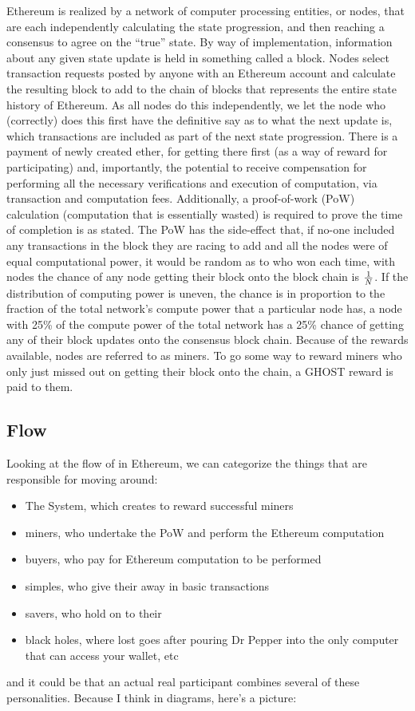 \documentclass[10pt,a4paper]{article}
\begin{document}
Ethereum is realized by a network of computer processing entities, or nodes, that are each independently calculating the state progression, and then reaching a consensus to agree on the ``true'' state. By way of implementation, information about any given state update is held in something called a block. Nodes select transaction requests posted by anyone with an Ethereum account and calculate the resulting block to add to the chain of blocks that represents the entire state history of Ethereum. As all nodes do this independently, we let the node who (correctly) does this first have the definitive say as to what the next update is, \ie which transactions are included as part of the next state progression. There is a payment of newly created ether, \R for getting there first (as a way of reward for participating) and, importantly, the potential to receive compensation for performing all the necessary verifications and execution of computation, via transaction and computation fees. Additionally, a proof-of-work (PoW) calculation (computation that is essentially wasted) is required to prove the time of completion is as stated. The PoW has the side-effect that, if no-one included any transactions in the block they are racing to add and all the nodes were of equal computational power, it would be random as to who won each time, \ie with \N nodes the chance of any node getting their block onto the block chain is $\frac{1}{{N}}$. If the distribution of computing power is uneven, the chance is in proportion to the fraction of the total network's compute power that a particular node has, \eg a node with 25\% of the compute power of the total network has a 25\% chance of getting any of their block updates onto the consensus block chain. Because of the rewards available, nodes are referred to as miners. To go some way to reward miners who only just missed out on getting their block onto the chain, a GHOST reward is paid to them.

\subsection*{\ether Flow}

Looking at the flow of \ether in Ethereum, we can categorize the things that are responsible for \ether moving around:
\begin{itemize} \itemsep=0pt
\item The System, which creates \ether to reward successful miners
\item miners, who undertake the PoW and perform the Ethereum computation 
\item buyers, who pay for Ethereum computation to be performed
\item simples, who give their \ether away in basic transactions
\item savers, who hold on to their \ether
\item black holes, where lost \ether goes after pouring Dr Pepper into the only computer that can access your wallet, etc
\end{itemize}
and it could be that an actual real participant combines several of these personalities. Because I think in diagrams, here's a picture:
\end{document}
